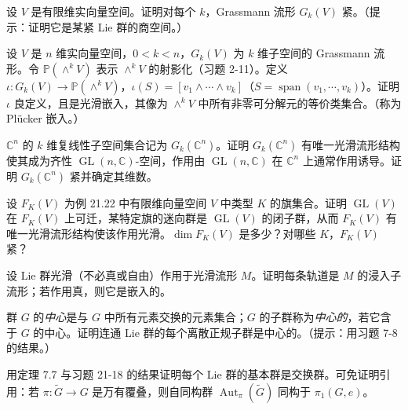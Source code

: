 \documentclass[../../main.tex]{subfiles}
\begin{document}
\begin{exercise}\label{exercise:ch21-13}
设 $V$ 是有限维实向量空间。证明对每个 $k$，Grassmann 流形 $G_k(V)$ 紧。（提示：证明它是某紧 Lie 群的商空间。）
\end{exercise}

\begin{exercise}\label{exercise:ch21-14}
设 $V$ 是 $n$ 维实向量空间，$0<k<n$，$G_k(V)$ 为 $k$ 维子空间的 Grassmann 流形。令 $\mathbb{P}(\wedge^k V)$ 表示 $\wedge^k V$ 的射影化（习题 2-11）。定义 $\iota\colon G_k(V)\to\mathbb{P}(\wedge^k V)$，$\iota(S)=[v_1\wedge\cdots\wedge v_k]$（$S=\operatorname{span}(v_1,\cdots ,v_k)$）。证明 $\iota$ 良定义，且是光滑嵌入，其像为 $\wedge^k V$ 中所有非零可分解元的等价类集合。（称为 Plücker 嵌入。）
\end{exercise}

\begin{exercise}\label{exercise:ch21-15}
$\mathbb{C}^n$ 的 $k$ 维复线性子空间集合记为 $G_k(\mathbb{C}^n)$。证明 $G_k(\mathbb{C}^n)$ 有唯一光滑流形结构使其成为齐性 $\operatorname{GL}(n,\mathbb{C})$-空间，作用由 $\operatorname{GL}(n,\mathbb{C})$ 在 $\mathbb{C}^n$ 上通常作用诱导。证明 $G_k(\mathbb{C}^n)$ 紧并确定其维数。
\end{exercise}

\begin{exercise}\label{exercise:ch21-16}
设 $F_K(V)$ 为例 21.22 中有限维向量空间 $V$ 中类型 $K$ 的旗集合。证明 $\operatorname{GL}(V)$ 在 $F_K(V)$ 上可迁，某特定旗的迷向群是 $\operatorname{GL}(V)$ 的闭子群，从而 $F_K(V)$ 有唯一光滑流形结构使该作用光滑。$\dim F_K(V)$ 是多少？对哪些 $K$，$F_K(V)$ 紧？
\end{exercise}

\begin{exercise}\label{exercise:ch21-17}
设 Lie 群光滑（不必真或自由）作用于光滑流形 $M$。证明每条轨道是 $M$ 的浸入子流形；若作用真，则它是嵌入的。
\end{exercise}

\begin{exercise}\label{exercise:ch21-18}
群 $G$ 的\emph{中心}是与 $G$ 中所有元素交换的元素集合；$G$ 的子群称为\emph{中心的}，若它含于 $G$ 的中心。证明连通 Lie 群的每个离散正规子群是中心的。（提示：用习题 7-8 的结果。）
\end{exercise}

\begin{exercise}\label{exercise:ch21-19}
用定理 7.7 与习题 21-18 的结果证明每个 Lie 群的基本群是交换群。可免证明引用：若 $\pi\colon\widetilde G\to G$ 是万有覆叠，则自同构群 $\operatorname{Aut}_\pi(\widetilde G)$ 同构于 $\pi_1(G,e)$。
\end{exercise}
\end{document}

